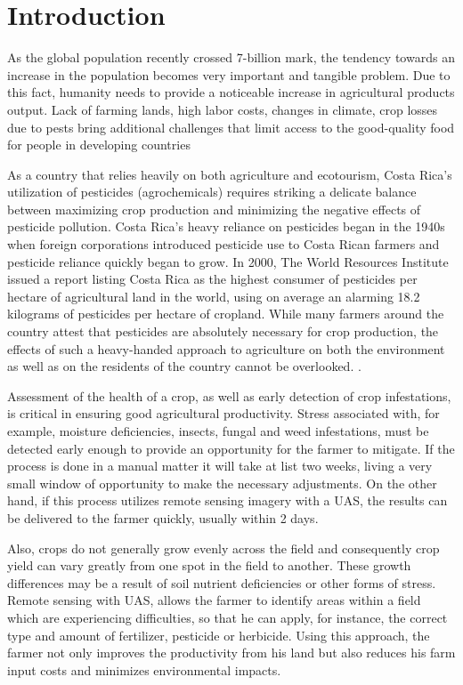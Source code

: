 \section{Introduction}
As the global population recently crossed 7-billion mark, the tendency towards an increase in the population becomes very important and tangible problem. Due to this fact, humanity needs to provide a noticeable increase in agricultural products output. Lack of farming lands, high labor costs, changes in climate, crop losses due to pests bring additional challenges that limit access to the good-quality food for people in developing countries\cite{7551564}

As a country that relies heavily on both agriculture and ecotourism, Costa Rica's utilization of pesticides (agrochemicals) requires striking a delicate balance between maximizing crop production and minimizing the negative effects of pesticide pollution. Costa Rica's heavy reliance on pesticides began in the 1940s when foreign corporations introduced pesticide use to Costa Rican farmers and pesticide reliance quickly began to grow. In 2000, The World Resources Institute issued a report listing Costa Rica as the highest consumer of pesticides per hectare of agricultural land in the world, using on average an alarming 18.2 kilograms of pesticides per hectare of cropland. While many farmers around the country attest that pesticides are absolutely necessary for crop production, the effects of such a heavy-handed approach to agriculture on both the environment as well as on the residents of the country cannot be overlooked. \cite{UNA}.

Assessment of the health of a crop, as well as early detection of crop infestations, is critical in ensuring good agricultural productivity. Stress associated with, for example, moisture deficiencies, insects, fungal and weed infestations, must be detected early enough to provide an opportunity for the farmer to mitigate. If the process is done in a manual matter it will take at list two weeks, living a very small window of opportunity to make the necessary adjustments. On the other hand, if this process utilizes remote sensing imagery with a UAS, the results can be delivered to the farmer quickly, usually within 2 days.\cite{crops}

Also, crops do not generally grow evenly across the field and consequently crop yield can vary greatly from one spot in the field to another. These growth differences may be a result of soil nutrient deficiencies or other forms of stress. Remote sensing with UAS, allows the farmer to identify areas within a field which are experiencing difficulties, so that he can apply, for instance, the correct type and amount of fertilizer, pesticide or herbicide. Using this approach, the farmer not only improves the productivity from his land but also reduces his farm input costs and minimizes environmental impacts.\cite{crops}


